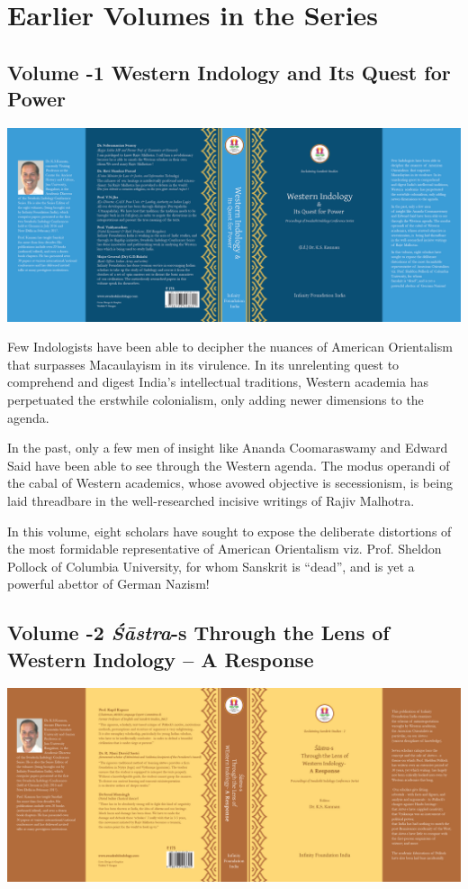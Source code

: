 
\chapter*{Earlier Volumes in the Series}\label{evc}

\section*{\num{Volume -1} Western Indology and Its Quest for Power}

\includegraphics{images/fig01.png}

Few Indologists have been able to decipher the nuances of American Orientalism that surpasses Macaulayism in its virulence. In its unrelenting quest to comprehend and digest India’s intellectual traditions, Western academia has perpetuated the erstwhile colonialism, only adding newer dimensions to the agenda. 

In the past, only a few men of insight like Ananda Coomaraswamy and Edward Said have been able to see through the Western agenda. The modus operandi of the cabal of Western academics, whose avowed objective is secessionism, is being laid threadbare in the well-researched incisive writings of Rajiv Malhotra.

In this volume, eight scholars have sought to expose the deliberate distortions of the most formidable representative of American Orientalism viz. Prof. Sheldon Pollock of Columbia University, for whom Sanskrit is “dead”, and is yet a powerful abettor of German Nazism!


\section*{\num{Volume -2} \textit{Śāstra}-s Through the Lens of Western Indology – A Response}

\includegraphics{images/fig02.png}

